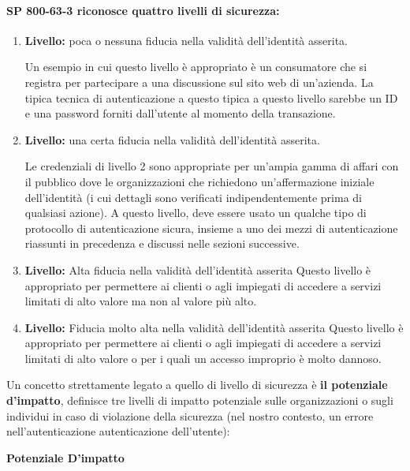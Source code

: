 \paragraph{SP 800-63-3 riconosce quattro livelli di sicurezza:}
\begin{enumerate}
    \item \textbf{Livello:} poca o nessuna fiducia nella validità dell'identità asserita.
    
Un esempio in cui questo livello è appropriato è un consumatore che si registra per partecipare a una discussione sul sito web di un'azienda. La tipica tecnica di autenticazione a questo tipica a questo livello sarebbe un ID e una password forniti dall'utente al momento della transazione.
    
    \item \textbf{Livello:} una certa fiducia nella validità dell'identità asserita.

Le credenziali di livello 2 sono appropriate per un'ampia gamma di affari con il pubblico dove le organizzazioni che richiedono un'affermazione iniziale dell'identità (i cui dettagli sono verificati indipendentemente prima di qualsiasi azione). A questo livello, deve essere usato un qualche tipo di protocollo di autenticazione sicura, insieme a uno dei mezzi di autenticazione riassunti in precedenza e discussi nelle sezioni successive.

    \item \textbf{Livello:} Alta fiducia nella validità dell'identità asserita
Questo livello è appropriato per permettere ai clienti o agli impiegati di accedere a servizi limitati di alto valore ma non al valore più alto.


    \item\textbf{Livello:} Fiducia molto alta nella validità dell'identità asserita
Questo livello è appropriato per permettere ai clienti o agli impiegati di accedere a servizi limitati di alto valore o per i quali un accesso improprio è molto dannoso.
\end{enumerate}

Un concetto strettamente legato a quello di livello di sicurezza è \textbf{il potenziale d'impatto}, definisce tre livelli di impatto potenziale sulle organizzazioni o sugli individui in caso di violazione della sicurezza (nel nostro contesto, un errore nell'autenticazione autenticazione dell'utente):

\begin{center}
    \textbf{Potenziale D'impatto}
\end{center}

